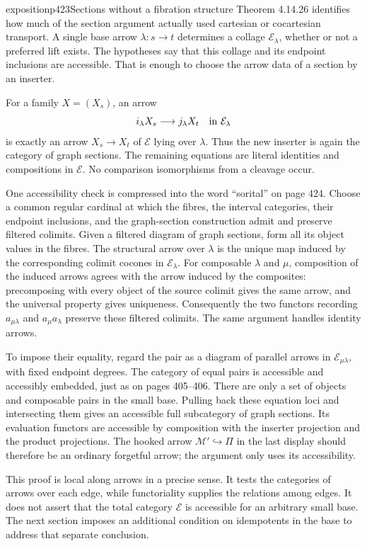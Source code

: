\begin{dcomment}{exposition}{p423}{Sections without a fibration structure}
Theorem 4.14.26 identifies how much of the section argument actually used cartesian or cocartesian transport. A single base arrow $\lambda:s\to t$ determines a collage $\mathcal E_\lambda$, whether or not a preferred lift exists. The hypotheses say that this collage and its endpoint inclusions are accessible. That is enough to choose the arrow data of a section by an inserter.

For a family $X=(X_s)$, an arrow
\[
 i_\lambda X_s\longrightarrow j_\lambda X_t
 \quad\hbox{in }\mathcal E_\lambda
\]
is exactly an arrow $X_s\to X_t$ of $\mathcal E$ lying over $\lambda$. Thus the new inserter is again the category of graph sections. The remaining equations are literal identities and compositions in $\mathcal E$. No comparison isomorphisms from a cleavage occur.

One accessibility check is compressed into the word ``sorital'' on page 424. Choose a common regular cardinal at which the fibres, the interval categories, their endpoint inclusions, and the graph-section construction admit and preserve filtered colimits. Given a filtered diagram of graph sections, form all its object values in the fibres. The structural arrow over $\lambda$ is the unique map induced by the corresponding colimit cocones in $\mathcal E_\lambda$. For composable $\lambda$ and $\mu$, composition of the induced arrows agrees with the arrow induced by the composites: precomposing with every object of the source colimit gives the same arrow, and the universal property gives uniqueness. Consequently the two functors recording $a_{\mu\lambda}$ and $a_\mu a_\lambda$ preserve these filtered colimits. The same argument handles identity arrows.

To impose their equality, regard the pair as a diagram of parallel arrows in $\mathcal E_{\mu\lambda}$, with fixed endpoint degrees. The category of equal pairs is accessible and accessibly embedded, just as on pages 405--406. There are only a set of objects and composable pairs in the small base. Pulling back these equation loci and intersecting them gives an accessible full subcategory of graph sections. Its evaluation functors are accessible by composition with the inserter projection and the product projections. The hooked arrow $\mathcal M'\hookrightarrow\Pi$ in the last display should therefore be an ordinary forgetful arrow; the argument only uses its accessibility.

This proof is local along arrows in a precise sense. It tests the categories of arrows over each edge, while functoriality supplies the relations among edges. It does not assert that the total category $\mathcal E$ is accessible for an arbitrary small base. The next section imposes an additional condition on idempotents in the base to address that separate conclusion.
\end{dcomment}

